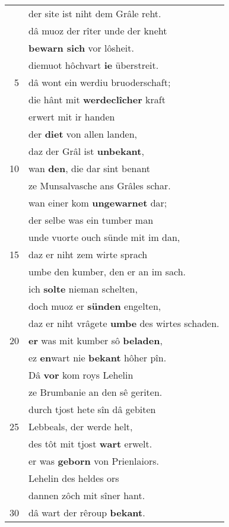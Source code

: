 \documentclass[8pt,a4paper,notitlepage]{article}
\begin{document}
\begin{table}[ht]
\begin{minipage}[t]{0.5\linewidth}
\begin{center}
\end{center}
\begin{tabular}{rl}
 & der site ist niht dem Grâle reht.\\ 
 & dâ muoz der rîter unde der kneht\\ 
 & \textbf{bewarn sich} vor lôsheit.\\ 
 & diemuot hôchvart \textbf{ie} überstreit.\\ 
5 & dâ wont ein werdiu bruoderschaft;\\ 
 & die hânt mit \textbf{werdeclîcher} kraft\\ 
 & erwert mit ir handen\\ 
 & der \textbf{diet} von allen landen,\\ 
 & daz der Grâl ist \textbf{unbekant},\\ 
10 & wan \textbf{den}, die dar sint benant\\ 
 & ze Munsalvasche ans Grâles schar.\\ 
 & wan einer kom \textbf{ungewarnet} dar;\\ 
 & der selbe was ein tumber man\\ 
 & unde vuorte ouch sünde mit im dan,\\ 
15 & daz er niht zem wirte sprach\\ 
 & umbe den kumber, den er an im sach.\\ 
 & ich \textbf{solte} nieman schelten,\\ 
 & doch muoz er \textbf{sünden} engelten,\\ 
 & daz er niht vrâgete \textbf{umbe} des wirtes schaden.\\ 
20 & \textbf{er} was mit kumber sô \textbf{beladen},\\ 
 & ez \textbf{en}wart nie \textbf{bekant} hôher pîn.\\ 
 & Dâ \textbf{vor} kom roys Lehelin\\ 
 & ze Brumbanie an den sê geriten.\\ 
 & durch tjost hete sîn dâ gebiten\\ 
25 & Lebbeals, der werde helt,\\ 
 & des tôt mit tjost \textbf{wart} erwelt.\\ 
 & er was \textbf{geborn} von Prienlaiors.\\ 
 & Lehelin des heldes ors\\ 
 & dannen zôch mit sîner hant.\\ 
30 & dâ wart der rêroup \textbf{bekant}.\\ 
\end{tabular}

\end{minipage}
\end{table}
\end{document}
